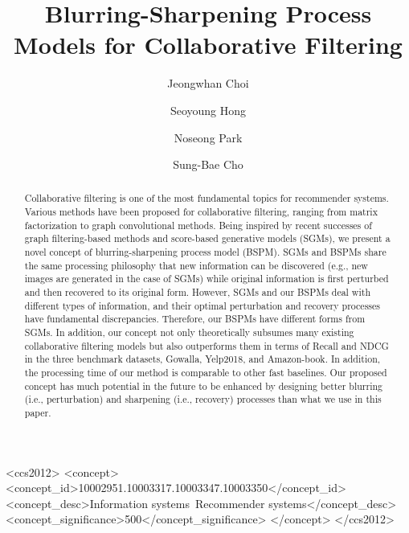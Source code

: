 \documentclass[sigconf,natbib=true]{acmart}
\begin{document}
\title{Blurring-Sharpening Process Models for Collaborative Filtering}

\author{Jeongwhan Choi}

\author{Seoyoung Hong}

\author{Noseong Park}

\author{Sung-Bae Cho}


\renewcommand{\shortauthors}{Choi, et al.}

\begin{abstract}
Collaborative filtering is one of the most fundamental topics for recommender systems. Various methods have been proposed for collaborative filtering, ranging from matrix factorization to graph convolutional methods. Being inspired by recent successes of graph filtering-based methods and score-based generative models (SGMs), we present a novel concept of blurring-sharpening process model (BSPM). SGMs and BSPMs share the same processing philosophy that new information can be discovered (e.g., new images are generated in the case of SGMs) while original information is first perturbed and then recovered to its original form. However, SGMs and our BSPMs deal with different types of information, and their optimal perturbation and recovery processes have fundamental discrepancies. Therefore, our BSPMs have different forms from SGMs. In addition, our concept not only theoretically subsumes many existing collaborative filtering models but also outperforms them in terms of Recall and NDCG in the three benchmark datasets, Gowalla, Yelp2018, and Amazon-book. In addition, the processing time of our method is comparable to other fast baselines. Our proposed concept has much potential in the future to be enhanced by designing better blurring (i.e., perturbation) and sharpening (i.e., recovery) processes than what we use in this paper.
\end{abstract}

\begin{CCSXML}
<ccs2012>
   <concept>
       <concept_id>10002951.10003317.10003347.10003350</concept_id>
       <concept_desc>Information systems~Recommender systems</concept_desc>
       <concept_significance>500</concept_significance>
       </concept>
 </ccs2012>
\end{CCSXML}
\end{document}
